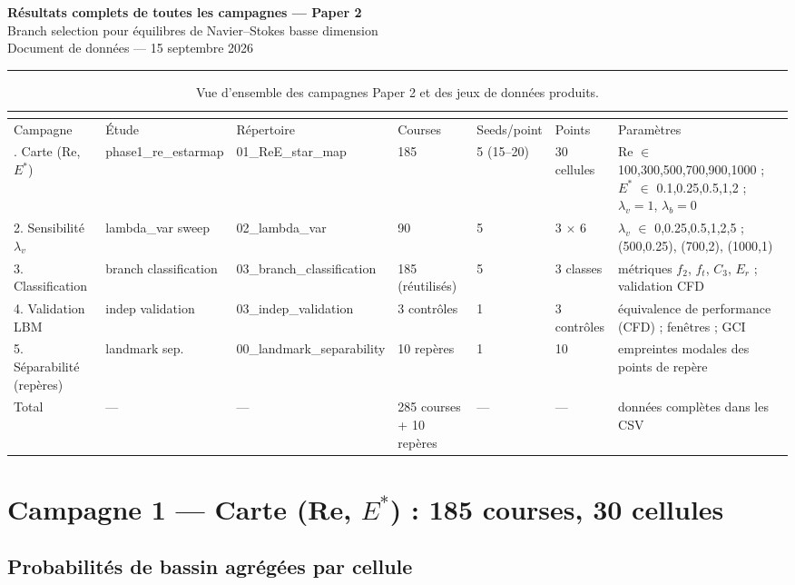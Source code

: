 \documentclass[11pt,a4paper]{article}
\newcommand{\ruler}{\noindent\rule{\linewidth}{0.4pt}}
\begin{document}
\begin{center}
{\LARGE\bfseries Résultats complets de toutes les campagnes --- Paper 2}\\[6pt]
{\large Branch selection pour équilibres de Navier--Stokes basse dimension}\\[4pt]
Document de données --- 15 septembre 2026
\end{center}
\ruler


\begingroup\scriptsize
    \setlength{\tabcolsep}{2pt}
    \begin{longtable}{p{1.1cm} p{2.3cm} p{2.1cm} p{1.3cm} p{0.9cm} p{1.1cm} p{7.2cm}}
    \caption{Vue d'ensemble des campagnes Paper 2 et des jeux de données produits.}\\
    \label{tab:overview}\\
    \toprule
    Campagne & Étude & Répertoire & Courses & Seeds/point & Points & Paramètres \\
    \midrule
    \endhead
    \bottomrule
    \endlastfoot
    1. Carte (Re, $E^*$) & phase1\_re\_estarmap & 01\_ReE\_star\_map & 185 & 5 (15--20) & 30 cellules & Re $\in$ {100,300,500,700,900,1000} ; $E^*$ $\in$ {0.1,0.25,0.5,1,2} ; $\lambda_v{=}1$, $\lambda_b{=}0$ \\
    2. Sensibilité $\lambda_v$ & lambda\_var sweep & 02\_lambda\_var & 90 & 5 & 3 $\times$ 6 & $\lambda_v$ $\in$ {0,0.25,0.5,1,2,5} ; (500,0.25), (700,2), (1000,1) \\
    3. Classification & branch classification & 03\_branch\_classification & 185 (réutilisés) & 5 & 3 classes & métriques $f_2$, $f_t$, $C_3$, $E_r$ ; validation CFD \\
    4. Validation LBM & indep validation & 03\_indep\_validation & 3 contrôles & 1 & 3 contrôles & équivalence de performance (CFD) ; fenêtres ; GCI \\
    5. Séparabilité (repères) & landmark sep. & 00\_landmark\_separability & 10 repères & 1 & 10 & empreintes modales des points de repère \\
    Total & --- & --- & 285 courses + 10 repères & --- & --- & données complètes dans les CSV \\
    \end{longtable}
\endgroup


\section{Campagne 1 --- Carte (Re, $E^*$) : 185 courses, 30 cellules}

\subsection{Probabilités de bassin agrégées par cellule}
\end{document}
